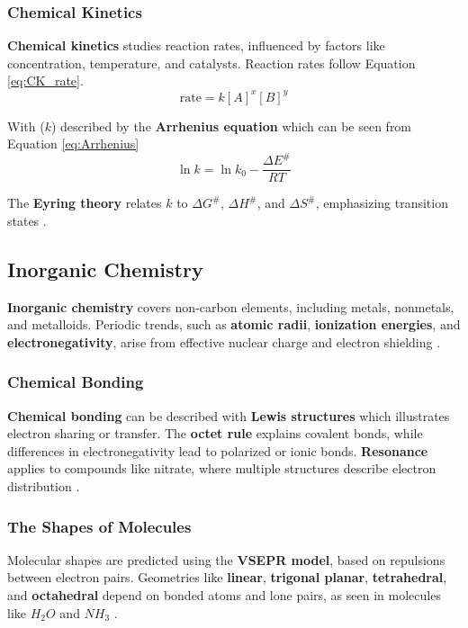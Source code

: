 \subsubsection*{Chemical Kinetics}
\textbf{Chemical kinetics} studies reaction rates, influenced by factors like concentration, temperature, and catalysts. Reaction rates follow Equation \ref*{eq:CK_rate}. 
\begin{equation} 
    \text{rate}=k[A]^x[B]^y
    \label{eq:CK_rate}
\end{equation}

With ($k$) described by the \textbf{Arrhenius equation}  which can be seen from Equation \ref*{eq:Arrhenius} 
\begin{equation}
    \ln k=\ln k_0- \frac{\Delta E^\#}{RT} 
    \label{eq:Arrhenius}    
\end{equation}

The \textbf{Eyring theory} relates $k$ to $\Delta G^\#$, $\Delta H^\#$, and $\Delta S^\#$, emphasizing transition states \cite*{BKR_01}.

\subsection*{Inorganic Chemistry}
\textbf{Inorganic chemistry} covers non-carbon elements, including metals, nonmetals, and metalloids. Periodic trends, such as \textbf{atomic radii}, \textbf{ionization energies}, and \textbf{electronegativity}, arise from effective nuclear charge and electron shielding \cite*{BKR_01}.

\subsubsection*{Chemical Bonding}
\textbf{Chemical bonding} can be described with \textbf{Lewis structures} which illustrates electron sharing or transfer. The \textbf{octet rule} explains covalent bonds, while differences in electronegativity lead to polarized or ionic bonds. \textbf{Resonance} applies to compounds like nitrate, where multiple structures describe electron distribution \cite*{BKR_01}.

\subsubsection*{The Shapes of Molecules}
Molecular shapes are predicted using the \textbf{VSEPR model}, based on repulsions between electron pairs. Geometries like \textbf{linear}, \textbf{trigonal planar}, \textbf{tetrahedral}, and \textbf{octahedral} depend on bonded atoms and lone pairs, as seen in molecules like \textbf{$H_2O$} and \textbf{$NH_3$} \cite*{BKR_01}.

